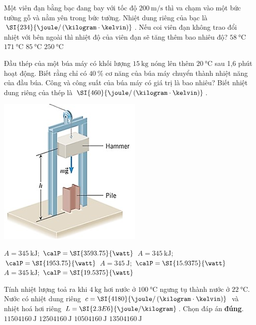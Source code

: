 \begin{ex}
	Một viên đạn bằng bạc đang bay với tốc độ $\SI{200}{\meter/\second}$ thì va chạm vào một bức tường gỗ và nằm yên trong bức tường. Nhiệt dung riêng của bạc là $\SI{234}{\joule/\left(\kilogram\cdot\kelvin\right)}$. Nếu coi viên đạn không trao đổi nhiệt với bên ngoài thì nhiệt độ của viên đạn sẽ tăng thêm bao nhiêu độ?
	\choice
	{$\SI{58}{\celsius}$}
	{$\SI{171}{\celsius}$}
	{\True $\SI{85}{\celsius}$}
	{$\SI{250}{\celsius}$}
\end{ex}
\begin{ex}
	Đầu thép của một búa máy có khối lượng $\SI{15}{\kilogram}$ nóng lên thêm $\SI{20}{\celsius}$ sau 1,6 phút hoạt động. Biết rằng chỉ có $\SI{40}{\percent}$ cơ năng của búa máy chuyển thành nhiệt năng của đầu búa. Công và công suất của búa máy có giá trị là bao nhiêu? Biết nhiệt dung riêng của thép là $\SI{460}{\joule/\left(\kilogram\cdot\kelvin\right)}$.
	\begin{center}
	\includegraphics[width=0.35\linewidth]{../figs/G12-D1-1}
	\end{center}
	\choice
	{\True $A=\SI{345}{\kilo\joule}$; $\calP=\SI{3593.75}{\watt}$}
	{$A=\SI{345}{\kilo\joule}$; $\calP=\SI{1953.75}{\watt}$}
	{$A=\SI{345}{\joule}$; $\calP=\SI{15.9375}{\watt}$}
	{$A=\SI{345}{\kilo\joule}$; $\calP=\SI{19.5375}{\watt}$}
\end{ex}
\begin{ex}
Tính nhiệt lượng toả ra khi $\SI{4}{\kilogram}$ hơi nước ở $\SI{100}{\celsius}	$ ngưng tụ thành nước ở $\SI{22}{\celsius}$. Nước có nhiệt dung riêng $c=\SI{4180}{\joule/\left(\kilogram\cdot\kelvin\right)}$ và nhiệt hoá hơi riêng $L=\SI{2.3E6}{\joule/\kilogram}$. Chọn đáp án \textbf{đúng}.
	\choice
	{$\SI{11504160}{\joule}$}
	{$\SI{12504160}{\joule}$}
	{\True $\SI{10504160}{\joule}$}
	{$\SI{13504160}{\joule}$}
\end{ex}
